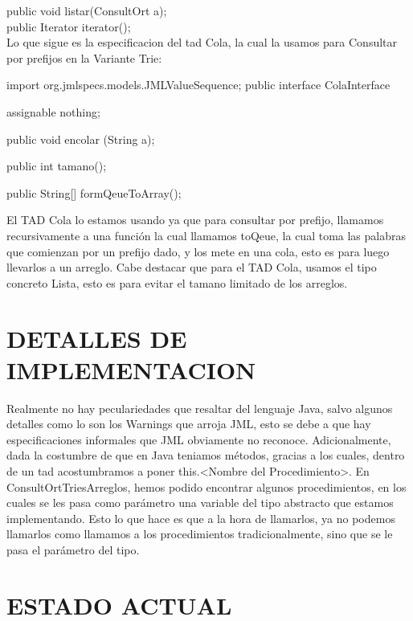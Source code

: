 \documentclass{article}
\begin{document}
{    public void listar(ConsultOrt a);\\

    public Iterator iterator();\\

    Lo que sigue es la especificacion del tad Cola, la cual la usamos para Consultar por prefijos en la Variante Trie:

import org.jmlspecs.models.JMLValueSequence;
public interface ColaInterface {



  assignable nothing;
  
public void encolar (String a);

public int tamano();

public String[] formQeueToArray();\\

}

    El TAD Cola lo estamos usando ya que para consultar por prefijo, llamamos recursivamente a una funci\'on la cual llamamos toQeue, la cual toma las palabras que comienzan por un prefijo dado, y los mete en una cola, esto es para luego llevarlos a un arreglo. Cabe destacar que para el TAD Cola, usamos el tipo concreto Lista, esto es para evitar el tamano limitado de los arreglos.



\newpage    
\section{DETALLES DE IMPLEMENTACION}

    Realmente no hay peculariedades que resaltar del lenguaje Java, salvo algunos detalles como lo son los Warnings que arroja JML, esto se debe a que hay especificaciones informales que JML obviamente no reconoce. Adicionalmente, dada la costumbre de que en Java teniamos m\'etodos, gracias a los cuales, dentro de un tad acostumbramos a poner this.<Nombre del Procedimiento>. En ConsultOrtTriesArreglos, hemos podido encontrar algunos procedimientos, en los cuales se les pasa como par\'ametro una variable del tipo abstracto que estamos implementando. Esto lo que hace es que a la hora de llamarlos, ya no podemos llamarlos como llamamos a los procedimientos  tradicionalmente, sino que se le pasa el par\'ametro del tipo.\\



\section{ESTADO ACTUAL}

}
\end{document}
